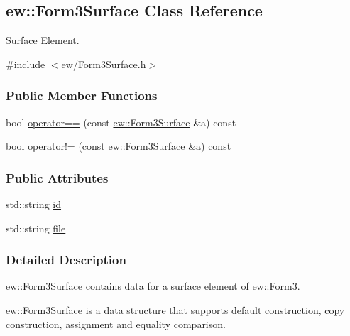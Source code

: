 \hypertarget{classew_1_1Form3Surface}{
\subsection{ew::Form3Surface Class Reference}
\label{classew_1_1Form3Surface}
}


Surface Element.  




{\ttfamily \#include $<$ew/Form3Surface.h$>$}

\subsubsection*{Public Member Functions}
\begin{DoxyCompactItemize}
\item 
bool \hyperlink{classew_1_1Form3Surface_a66dea9acebc6974b061b8df01e237549}{operator==} (const \hyperlink{classew_1_1Form3Surface}{ew::Form3Surface} \&a) const 
\item 
bool \hyperlink{classew_1_1Form3Surface_a24dce441e5227c60b7b7ad26f065488e}{operator!=} (const \hyperlink{classew_1_1Form3Surface}{ew::Form3Surface} \&a) const 
\end{DoxyCompactItemize}
\subsubsection*{Public Attributes}
\begin{DoxyCompactItemize}
\item 
std::string \hyperlink{classew_1_1Form3Surface_aa207964ce409cd2cd7b0d4a02ad18d5a}{id}
\item 
std::string \hyperlink{classew_1_1Form3Surface_a70132033d556f202a04d25126e4d2808}{file}
\end{DoxyCompactItemize}


\subsubsection{Detailed Description}
\hyperlink{classew_1_1Form3Surface}{ew::Form3Surface} contains data for a surface element of \hyperlink{classew_1_1Form3}{ew::Form3}.

\hyperlink{classew_1_1Form3Surface}{ew::Form3Surface} is a data structure that supports default construction, copy construction, assignment and equality comparison. 


